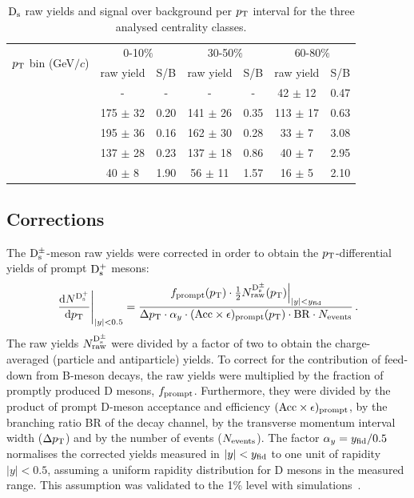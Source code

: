  \begin{table}[!h]
 \begin{center}
  \begin{tabular}{|c|c|c|c|c|c|c|}
\hline
\multirow{2}{*}{$p_{\rm T}$ bin (GeV$/c$)}& \multicolumn{2}{c|}{0-10$\%$} & \multicolumn{2}{c|}{30-50$\%$} & \multicolumn{2}{c|}{60-80$\%$} \\
\cline{2-7}
& raw yield & S/B & raw yield & S/B & raw yield & S/B \\
\hline
\hline
[2,4] & -  & - & -  & - & 42 $\pm$ 12 & 0.47 \\
\hline
[4,6] &  175 $\pm$ 32  & 0.20 & 141 $\pm$ 26  & 0.35 & 113 $\pm$ 17 & 0.63\\
\hline
[6,8] &  195 $\pm$ 36  & 0.16 & 162 $\pm$ 30 & 0.28 & 33 $\pm$ 7 & 3.08 \\
\hline
[8,12] & 137 $\pm$ 28 & 0.23 & 137 $\pm$ 18 & 0.86 & 40 $\pm$ 7 & 2.95 \\
\hline
[12,16] & 40 $\pm$ 8  & 1.90 & 56 $\pm$ 11 & 1.57 & 16 $\pm$ 5 & 2.10 \\
\hline
  \end{tabular}
 \caption{${\rm D_s}$ raw yields and signal over background per $p_{\rm T}$ interval for the three analysed centrality classes.}
  \label{tab:signalDs_010_3050_6080}
\end{center}
\end{table} 

\subsection{Corrections}
\label{sec:CorrectionsAA}
The ${\rm D_s^{\pm}}$-meson raw yields were corrected in order to obtain the
$p_{\rm T}$-differential yields of prompt ${\rm D_s^+}$ mesons: 
\begin{equation}
  \label{eq:dNdpt}
  \left.\frac{{\rm d} N^{{\rm D_s^+}}}{{\rm d}p_{\rm T}}\right|_{|y|<0.5}=
  \frac{\left.f_{\rm prompt}(p_{\rm T})\cdot \frac{1}{2} N_{\rm raw}^{\rm
        {\rm D_s^{\pm}}}(p_{\rm T})\right|_{|y|<y_{\rm fid}}}{\Delta p_{\rm T} \cdot
    \alpha_y \cdot ({\rm Acc}\times\epsilon)_{\rm prompt}(p_{\rm T})
    \cdot{\rm BR} \cdot N_{\rm events}}\,.
\end{equation}
The raw yields $N_{\rm raw}^{\rm {\rm D_s^{\pm}}}$ were divided by 
a factor of two to obtain the charge-averaged (particle and antiparticle) 
yields. To correct for the contribution of feed-down from B-meson decays,
 the raw yields were multiplied by the fraction of promptly produced D 
 mesons, $f_{\rm prompt}$. Furthermore, they were divided by the product 
 of prompt D-meson acceptance and efficiency 
 $({\rm Acc}\times\epsilon)_{\rm prompt}$, by the branching ratio {\rm BR} 
 of the decay channel, by the transverse momentum interval width 
 ($\Delta p_{\rm T}$) and by the number of events ($N_{\rm events}$). The factor 
 $\alpha_y=y_{\rm fid}/0.5$ normalises the corrected yields measured in 
 $|y|<y_{\rm fid}$ to one unit of rapidity $|y|<0.5$, assuming a uniform 
 rapidity distribution for D mesons in the measured range. This assumption
  was validated to the 1\% level with simulations~\cite{ALICE:2011aa, Skands:2009zm}.

